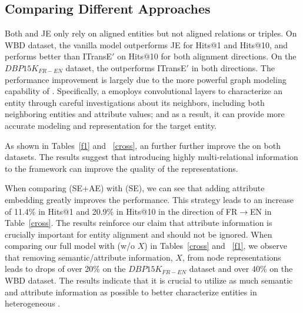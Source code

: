 \subsection{Comparing Different Approaches\label{sec:analysis}}




 Both  \GCN and JE only rely on aligned entities but not aligned relations or triples.  On WBD dataset,
the vanilla \GCN model outperforms JE for Hits@1 and Hits@10, and performs better than ITransE$'$ on Hits@10 for both alignment directions.
On the $DBP15K_{FR-EN}$ dataset, the \GCN outperforms ITransE$'$ in both directions. The performance improvement is largely due to the more
powerful graph modeling capability of \GCNs. Specifically, a \GCN emoploys convolutional layers to characterize an entity through careful
investigations about its neighbors, including both neighboring entities and attribute values; and as a result, it can provide more accurate
modeling and representation for the target entity.

 As shown in Tables~\ref{f1} and ~\ref{cross}, an \RGCN further further improve the \GCN on both datasets. The
results suggest that introducing highly multi-relational information to the \GCN framework can improve the quality of the \KG
representations.


 When comparing \HRGCN (SE+AE) with  \HRGCN (SE), we can see that adding attribute embedding greatly improves
the performance. This strategy leads to an increase of 11.4\%  in Hits@1 and 20.9\% in Hits@10 in the direction of FR$\rightarrow$EN in
Table~\ref{cross}. The results reinforce our claim that attribute information is crucially important for entity alignment and should not be
ignored. When comparing our full model \HRGCN with \HRGCN (w/o $X$) in Tables~\ref{cross} and ~\ref{f1}, we observe that removing
semantic/attribute information, $X$, from node representations leads to drops of over 20\% on the $DBP15K_{FR-EN}$ dataset and over 40\% on
the WBD dataset. The results indicate that it is crucial to utilize as much semantic and attribute information as possible to better
characterize entities in heterogeneous \KGs.

